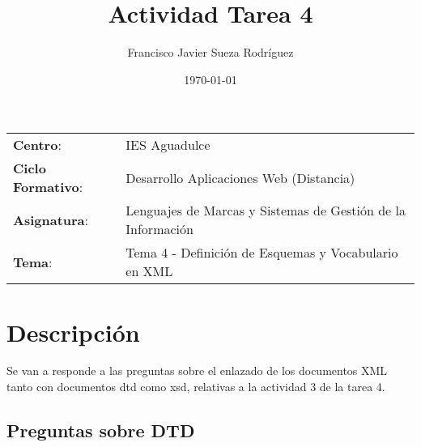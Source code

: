


\title{
\normalfont \normalsize
\huge \textbf{Actividad Tarea 4}
}
\author{Francisco Javier Sueza Rodríguez}
\date{\normalsize\today}



\maketitle

\vspace{2ex}

\begin{center}
    \begin{tabular}{l l}
        \textbf{Centro}: & IES Aguadulce \\
        \textbf{Ciclo Formativo}: & Desarrollo Aplicaciones Web (Distancia)\\
        \textbf{Asignatura}: & Lenguajes de Marcas y Sistemas de Gestión de la Información\\
        \textbf{Tema}: & Tema 4 - Definición de Esquemas y Vocabulario en XML \\
    \end{tabular}
\end{center}

\vspace{10ex}

\section{Descripción}
Se van a responde a las preguntas sobre el enlazado de los documentos XML tanto con documentos dtd como xsd, relativas a la actividad 3 de la tarea 4.

\subsection{Preguntas sobre DTD}

